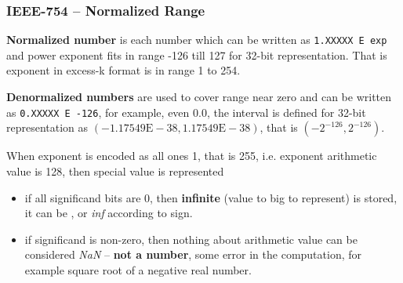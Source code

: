 \documentclass{beamer}
\begin{document}
\begin{frame}
\frametitle{IEEE-754 -- Normalized Range}

\textbf{Normalized number} is each number which can be written as \texttt{1.XXXXX E exp} and power exponent fits in range -126 till 127 for 32-bit representation. That is exponent in excess-k format is in range 1 to 254.

\bigskip
\textbf{Denormalized numbers} are used to cover range near zero and can be written as \texttt{0.XXXXX E -126}, for example, even 0.0, the interval is defined for 32-bit representation as $(-1.17549\text{E}-38,1.17549\text{E}-38)$, that is $(-2^{-126},2^{-126})$.

\bigskip
When exponent is encoded as all ones 1, that is 255, i.e. exponent arithmetic value is 128, then special value is represented
\begin{itemize}
\item if all significand bits are 0, then \textbf{infinite} (value to big to represent) is stored, it can be , or \textit{inf} according to sign.
\item if significand is non-zero, then nothing about arithmetic value can be considered \textit{NaN} --
\textbf{not a number}, some error in the computation, for example square root of a negative real number.
\end{itemize}
\end{frame}
\end{document}
